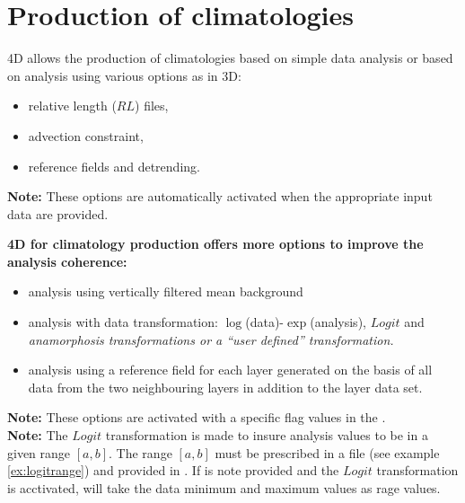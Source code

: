 
\section{Production of climatologies}

\diva 4D allows the production of climatologies based on simple \diva data analysis or based on \diva analysis using various options as in \diva 3D:

\begin{itemize}
\item relative length ($RL$) files,
\item advection constraint,
\item reference fields and detrending.
\end{itemize}

\vspace{-0.5cm}

{\bf Note:} These options are automatically activated when the appropriate input data are provided.

\vspace{0.5cm}

{\bf \diva 4D for climatology production offers more options to improve the analysis coherence:}

\vspace{-0.5cm}

\begin{itemize}
\item analysis using vertically filtered mean background
\item analysis with data transformation:  $\log$(data)-$\exp$(analysis), $Logit$ and \it{anamorphosis} transformations or a ``user defined'' transformation.
\item analysis using  a reference field for each layer generated on the basis of all data from the two neighbouring layers in addition to the layer data set.
\end{itemize}

\vspace{-0.5cm}

{\bf Note:} These options are activated with a specific flag values in the .\\
{\bf Note:} The  $Logit$ transformation is made to insure analysis values to be in a given range $[a,b]$. The range $[a,b]$ must be prescribed in a file  (see example \ref{ex:logitrange}) and provided in . If   is note provided and the $Logit$ transformation is acctivated, \diva will take the data minimum and maximum values as rage values.



